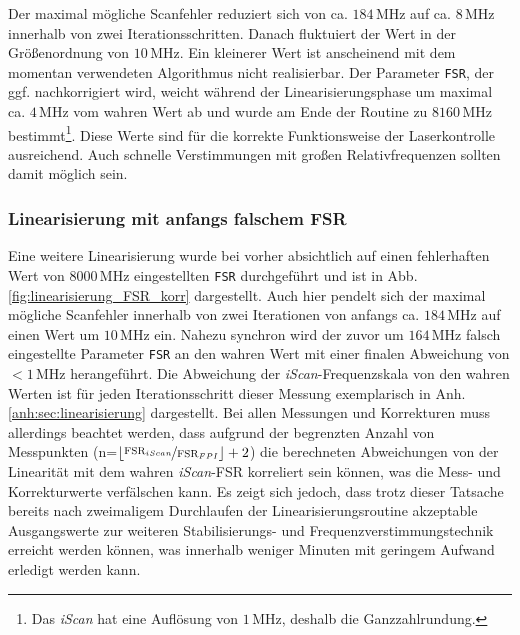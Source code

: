 Der maximal mögliche Scanfehler reduziert sich von
ca. $184\,$MHz auf ca. $8\,$MHz innerhalb von zwei Iterationsschritten. Danach
fluktuiert der Wert in der Größenordnung von $10\,$MHz. Ein kleinerer Wert ist
anscheinend mit dem momentan verwendeten Algorithmus nicht realisierbar. Der
Parameter \lstinline|FSR|, der ggf. nachkorrigiert wird, weicht
während der Linearisierungsphase um maximal ca. $4\,$MHz vom wahren Wert ab und
wurde am Ende der Routine zu $8160\,$MHz bestimmt\footnote{Das \textit{iScan}
hat eine Auflösung von $1\,$MHz, deshalb die Ganzzahlrundung.}. Diese Werte sind
für die korrekte Funktionsweise der Laserkontrolle ausreichend. Auch schnelle Verstimmungen mit großen
Relativfrequenzen sollten damit möglich sein.

\subsubsection{Linearisierung mit anfangs falschem
FSR}\label{subsubsec:linearisierung_FSR_korr}
Eine weitere Linearisierung wurde bei vorher absichtlich auf einen fehlerhaften
Wert von $8000\,$MHz eingestellten \lstinline|FSR| durchgeführt und ist in
Abb. \ref{fig:linearisierung_FSR_korr} dargestellt. Auch hier pendelt sich der
maximal mögliche Scanfehler innerhalb von zwei Iterationen von anfangs ca.
$184\,$MHz auf einen Wert um $10\,$MHz ein. Nahezu synchron wird der zuvor um
$164\,$MHz falsch eingestellte Parameter \lstinline|FSR| an den wahren Wert
mit einer finalen Abweichung von $<1\,$MHz herangeführt. Die Abweichung
der \textit{iScan}-Frequenzskala von den wahren Werten ist für jeden
Iterationsschritt dieser Messung exemplarisch in Anh.
\ref{anh:sec:linearisierung} dargestellt. Bei allen Messungen und Korrekturen
muss allerdings beachtet werden, dass aufgrund der begrenzten Anzahl von
Messpunkten (n=$\lfloor\nicefrac{\text{FSR}_{iScan}}{\text{FSR}_{FPI}}\rfloor+2$) die
berechneten Abweichungen von der Linearität mit dem wahren \textit{iScan}-FSR
korreliert sein können, was die Mess- und Korrekturwerte verfälschen kann. Es
zeigt sich jedoch, dass trotz dieser Tatsache bereits nach zweimaligem
Durchlaufen der Linearisierungsroutine akzeptable Ausgangswerte zur weiteren
Stabilisierungs- und Frequenzverstimmungstechnik erreicht werden können, was
innerhalb weniger Minuten mit geringem Aufwand erledigt werden kann.

